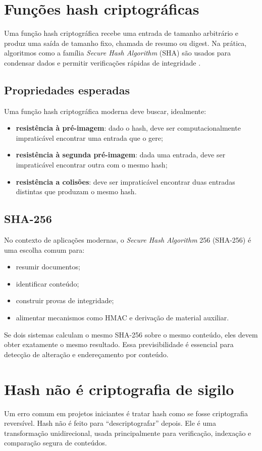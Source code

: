 \section{Funções hash criptográficas}
Uma função hash criptográfica recebe uma entrada de tamanho arbitrário e produz uma saída de tamanho fixo, chamada de resumo ou digest. Na prática, algoritmos como a família \textit{Secure Hash Algorithm} (SHA) são usados para condensar dados e permitir verificações rápidas de integridade \citep{fips180_4}.

\subsection{Propriedades esperadas}
Uma função hash criptográfica moderna deve buscar, idealmente:
\begin{itemize}[leftmargin=*]
  \item \textbf{resistência à pré-imagem}: dado o hash, deve ser computacionalmente impraticável encontrar uma entrada que o gere;
  \item \textbf{resistência à segunda pré-imagem}: dada uma entrada, deve ser impraticável encontrar outra com o mesmo hash;
  \item \textbf{resistência a colisões}: deve ser impraticável encontrar duas entradas distintas que produzam o mesmo hash.
\end{itemize}

\subsection{SHA-256}
No contexto de aplicações modernas, o \textit{Secure Hash Algorithm} 256 (SHA-256) é uma escolha comum para:
\begin{itemize}[leftmargin=*]
  \item resumir documentos;
  \item identificar conteúdo;
  \item construir provas de integridade;
  \item alimentar mecanismos como HMAC e derivação de material auxiliar.
\end{itemize}

Se dois sistemas calculam o mesmo SHA-256 sobre o mesmo conteúdo, eles devem obter exatamente o mesmo resultado. Essa previsibilidade é essencial para detecção de alteração e endereçamento por conteúdo.

\section{Hash não é criptografia de sigilo}
Um erro comum em projetos iniciantes é tratar hash como se fosse criptografia reversível. Hash não é feito para ``descriptografar'' depois. Ele é uma transformação unidirecional, usada principalmente para verificação, indexação e comparação segura de conteúdos.

